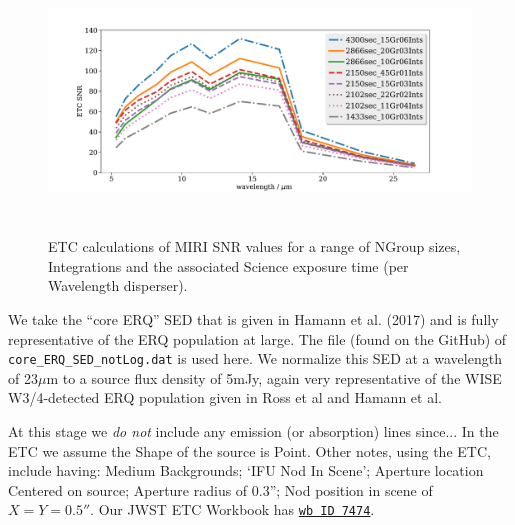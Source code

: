 %

\begin{figure}
  \begin{center}
  \includegraphics[height=7.0cm,width=16.5cm]{../ETC_calcs/SNR_vs_wavelength_comparisons_full.pdf}
    \end{center}
    \caption{ETC calculations of MIRI SNR values for a range of NGroup
      sizes, Integrations and the associated Science exposure time (per
      Wavelength disperser). }
    \label{fig:test-fig}
  \end{figure}

\smallskip \smallskip 
\noindent
We take the ``core ERQ'' SED that is given in Hamann et al. (2017) and
is fully representative of the ERQ population at large.  The file
(found on the GitHub) of {\tt core\_ERQ\_SED\_notLog.dat} is used
here.  We normalize this SED at a wavelength of 23$\mu$m to a source
flux density of 5mJy, again very representative of the WISE
W3/4-detected ERQ population given in Ross et al and Hamann et al.

\smallskip \smallskip 
\noindent
At this stage we {\it do not} include any emission (or absorption)
lines since...  In the ETC we assume the Shape of the source is Point.
Other notes, using the ETC, include having: Medium Backgrounds; `IFU
Nod In Scene'; Aperture location Centered on source; Aperture radius
of 0.3''; Nod position in scene of $X=Y=0.5''$.  Our JWST ETC Workbook
has \href{https://jwst.etc.stsci.edu/workbook.html?wb_id=7474}{{\tt wb
ID 7474}}.

